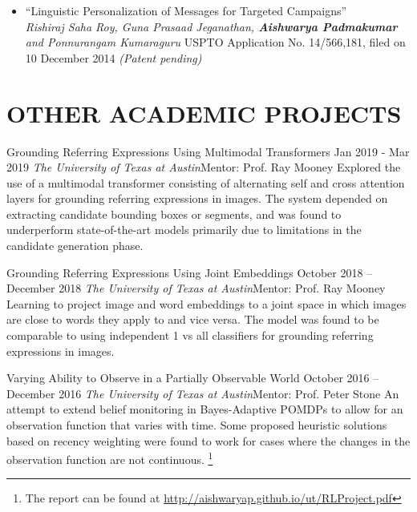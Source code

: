 \documentclass[letterpaper,10pt]{resume}
\begin{document}
{\begin{itemize}
\item ``Linguistic Personalization of Messages for Targeted Campaigns'' \\
\textit{Rishiraj Saha Roy, Guna Prasaad Jeganathan, \textbf{Aishwarya Padmakumar} and Ponnurangam Kumaraguru}
USPTO Application No. 14/566,181, filed on 10 December 2014 \textit{(Patent pending)}
\vspace{0.2cm}
\end{itemize}

\section{OTHER ACADEMIC PROJECTS}
\begin{itemize}
  \credentialtwo
    {{Grounding Referring Expressions Using Multimodal Transformers}}
    {\sf Jan 2019 - Mar 2019}
    {\it The University of Texas at Austin}{\textsf{Mentor: Prof. Ray Mooney}}
    {}
    { 
    \small 
    Explored the use of a multimodal transformer consisting of alternating self and cross attention layers for grounding referring expressions in images. The system depended on extracting candidate bounding boxes or segments, and was found to underperform state-of-the-art models primarily due to limitations in the candidate generation phase. 
    }
   \vspace{0.2cm}


  \credentialtwo
    {{Grounding Referring Expressions Using Joint Embeddings}}
    {\sf October 2018 -- December 2018}
    {\it The University of Texas at Austin}{\textsf{Mentor: Prof. Ray Mooney}}
    {}
    { 
    \small 
	Learning to project image and word embeddings to a joint space in which images are close to words they apply to and vice versa. The model was found to be comparable to using independent 1 vs all classifiers for grounding referring expressions in images. 
    }
   \vspace{0.2cm}


  \credentialtwo
    {{Varying Ability to Observe in a Partially Observable World}}
    {\sf October 2016 -- December 2016}
    {\it The University of Texas at Austin}{\textsf{Mentor: Prof. Peter Stone}}
    {}
    { 
    \small 
	An attempt to extend belief monitoring in Bayes-Adaptive POMDPs to allow for an observation function that varies with time. Some proposed heuristic solutions based on recency weighting were found to work for cases where the changes in the observation function are not continuous. \footnote{The report can be found at \url{http://aishwaryap.github.io/ut/RLProject.pdf}}
    }
   \vspace{0.2cm}   


\end{itemize}}
\end{document}
